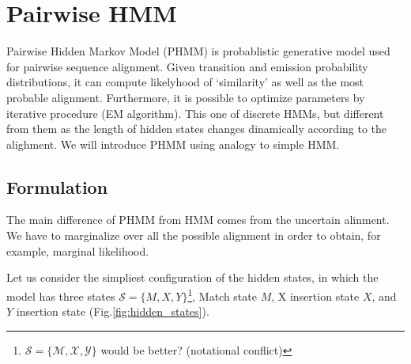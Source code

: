 \section{Pairwise HMM}
Pairwise Hidden Markov Model (PHMM) is probablistic generative model used for pairwise sequence alignment. Given transition and emission probability distributions, it can compute likelyhood of `similarity' as well as the most probable alignment. Furthermore, it is possible to optimize parameters by iterative procedure (EM algorithm). This one of discrete HMMs, but different from them as the length of hidden states changes dinamically according to the alighment. We will introduce PHMM using analogy to simple HMM.

\subsection{Formulation}
The main difference of PHMM from HMM comes from the uncertain alinment. We have to marginalize over all the possible alignment in order to obtain, for example, marginal likelihood. 

Let us consider the simpliest configuration of the hidden states, in which the model has three states $\mathcal{S} = \{M, X, Y\}$\footnote{$\mathcal{S} = \{\mathcal{M}, \mathcal{X}, \mathcal{Y}\}$ would be better? (notational conflict)}, Match state $M$, X insertion state $X$, and $Y$ insertion state (Fig.\ref{fig:hidden_states}). 

